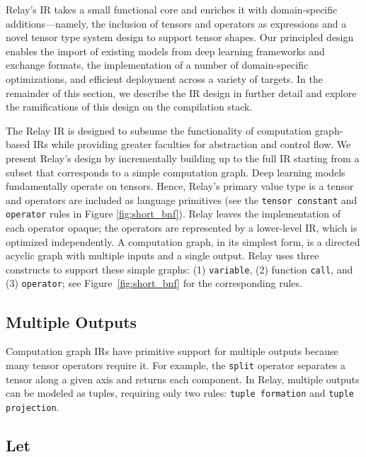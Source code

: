 Relay's IR takes a small functional core and enriches it with domain-specific additions---namely,
  the inclusion of tensors and operators as expressions
  and a novel tensor type system design to support tensor shapes.
Our principled design
  enables the import of existing models from deep learning frameworks and exchange formats,
  the implementation of a number of domain-specific optimizations,
  and efficient deployment across a variety of targets.
In the remainder of this section,
  we describe the IR design in further detail
  and explore the ramifications of this design on the compilation stack.



The Relay IR is designed
  to subsume the functionality of computation graph-based IRs
  while providing greater faculties for abstraction and control flow.
We present Relay's design by incrementally building up to the full IR
  starting from a subset that corresponds to a simple computation graph.
Deep learning models fundamentally operate on tensors.
Hence, Relay's primary value type is a tensor and operators are included as language primitives
  (see the \verb|tensor constant| and \verb|operator| rules in Figure \ref{fig:short_bnf}).
Relay leaves the implementation of each operator opaque; the operators
  are represented by a lower-level IR, which is optimized independently.
A computation graph, in its simplest form, is a directed acyclic
  graph with multiple inputs and a single output.
Relay uses three constructs to support these simple graphs:
  (1) \verb|variable|, (2) function \verb|call|,
  and (3) \verb|operator|; see Figure~\ref{fig:short_bnf} for the corresponding rules.

\subsection*{Multiple Outputs}

Computation graph IRs have primitive support for multiple outputs
  because many tensor operators require it.
For example, the \verb|split| operator separates a tensor along a given axis
  and returns each component.
In Relay, multiple outputs can be modeled as tuples,
  requiring only two rules: \verb|tuple formation| and \verb|tuple projection|.

\subsection*{Let}

